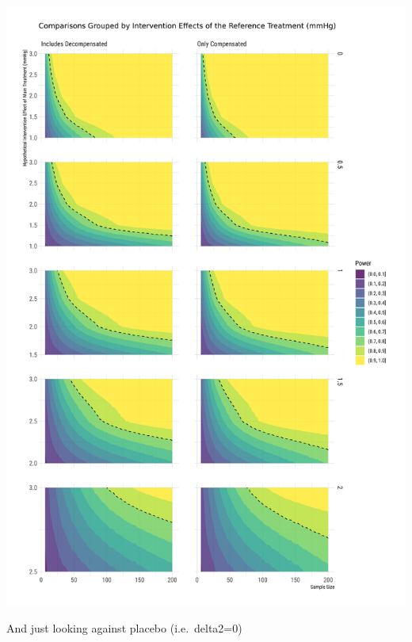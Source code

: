 \documentclass[
]{article}
\begin{document}
\includegraphics{figures/unnamed-chunk-79-2.png}

And just looking against placebo (i.e.~delta2=0)
\end{document}
